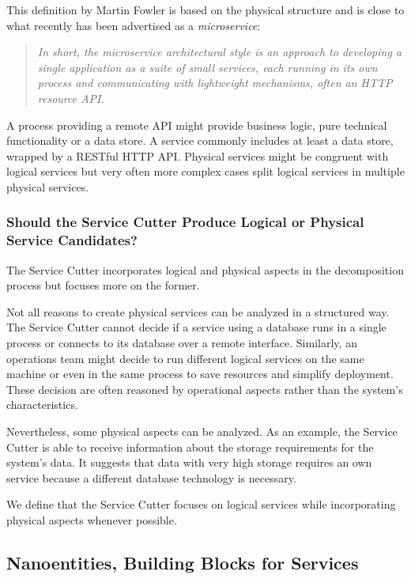 This definition by Martin Fowler is based on the physical structure and is close to what recently has been advertised as a \textit{microservice}:

\begin{quotation}
	\textit{In short, the microservice architectural style is an approach to developing a single application as a suite of small services, each running in its own process and communicating with lightweight mechanisms, often an HTTP resource API.}\cite{fowlerMicroservice}
\end{quotation}

A process providing a remote API might provide business logic, pure technical functionality or a data store. A service commonly includes at least a data store, wrapped by a RESTful HTTP API. Physical services might be congruent with logical services but very often more complex cases split logical services in multiple physical services. 

\subsubsection{Should the Service Cutter Produce Logical or Physical Service Candidates?}

The Service Cutter incorporates logical and physical aspects in the decomposition process but focuses more on the former. 

Not all reasons to create physical services can be analyzed in a structured way. The Service Cutter cannot decide if a service using a database runs in a single process or connects to its database over a remote interface. Similarly, an operations team might decide to run different logical services on the same machine or even in the same process to save resources and simplify deployment. These decision are often reasoned by operational aspects rather than the system's characteristics. 

Nevertheless, some physical aspects can be analyzed. As an example, the Service Cutter is able to receive information about the storage requirements for the system's data. It suggests that data with very high storage requires an own service because a different database technology is necessary. 

We define that the Service Cutter focuses on logical services while incorporating physical aspects whenever possible. 

\subsection{Nanoentities, Building Blocks for Services}

